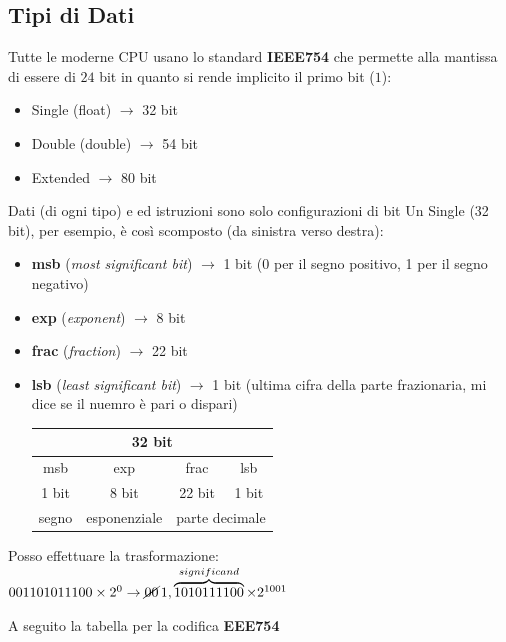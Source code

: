 \documentclass[a4paper,12pt, oneside]{book}
\begin{document}
\subsection{Tipi di Dati}
Tutte le moderne CPU usano lo standard \textbf{IEEE754} che permette alla mantissa di essere di $24$ bit  in quanto si rende implicito il primo bit ($1$):
\begin{itemize}
	\item Single (float) $\rightarrow$ 32 bit
	\item Double (double) $\rightarrow$ 54 bit
	\item Extended $\rightarrow$ 80 bit
\end{itemize}
Dati (di ogni tipo) e ed istruzioni sono solo configurazioni di bit
Un Single (32 bit), per esempio, è così scomposto (da sinistra verso destra):
\begin{itemize}
	\item \textbf{msb} (\textit{most significant bit}) $\rightarrow$ 1 bit (0 per il segno positivo, 1 per il segno negativo)
	\item \textbf{exp} (\textit{exponent}) $\rightarrow$ 8 bit
	\item \textbf{frac} (\textit{fraction}) $\rightarrow$ 22 bit
	\item \textbf{lsb} (\textit{least significant bit}) $\rightarrow$ 1 bit (ultima cifra della parte frazionaria, mi dice se il nuemro è pari o dispari)
	      \begin{center}
		      \begin{tabular}{c|c|c|c}
			      \multicolumn{4}{c}{32 bit}                                        \\ \hline
			      msb   & exp          & frac                               & lsb   \\ \hline
			      1 bit & 8 bit        & 22 bit                             & 1 bit \\ \hline
			      segno & esponenziale & \multicolumn{2}{c}{parte decimale}         \\ \hline
		      \end{tabular}
	      \end{center}
\end{itemize}
\begin{esempio}[???]
	Posso effettuare la trasformazione:\\
	$001101011100\times 2^0\rightarrow \cancel{00}\,1,\overbrace{1010111100}^{significand}\times 2^{1001}$
\end{esempio}
A seguito la tabella per la codifica \textbf{EEE754}
\end{document}
